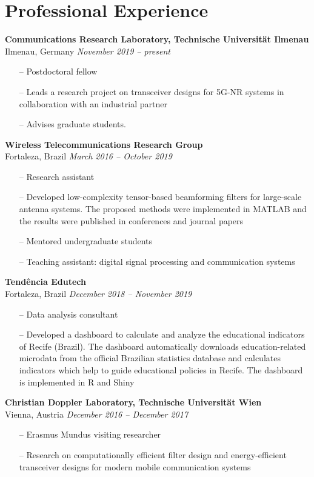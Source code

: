 \section{Professional Experience}

{\bf Communications Research Laboratory, Technische Universit\"at Ilmenau}\\
Ilmenau, Germany  \hfill {\it November 2019 -- present} \\
\begin{itemize}
	\item[--]	Postdoctoral fellow
	\item[--] Leads a research project on transceiver designs for 5G-NR systems in collaboration with an industrial partner
	\item[--] Advises graduate students.
\end{itemize}

{\bf Wireless Telecommunications Research Group}\\
Fortaleza, Brazil \hfill {\it March 2016 -- October 2019}\\
\begin{itemize}
	\item[--] Research assistant
	\item[--] Developed low-complexity tensor-based beamforming filters for large-scale antenna systems. The proposed methods were implemented in MATLAB and the results were published in conferences and journal papers
	\item[--] Mentored undergraduate students
	\item[--] Teaching assistant: digital signal processing and communication systems
\end{itemize}

{\bf Tendência Edutech}\\
Fortaleza, Brazil \hfill {\it December 2018 -- November 2019}\\
\begin{itemize}
	\item[--] Data analysis consultant
	\item[--] Developed a dashboard to calculate and analyze the educational indicators of Recife (Brazil). The dashboard automatically downloads education-related microdata from the official Brazilian statistics database and calculates indicators which help to guide educational policies in Recife. The dashboard is implemented in R and Shiny
\end{itemize}

{\bf Christian Doppler Laboratory, Technische Universit\"at Wien}\\
Vienna, Austria \hfill {\it December 2016 -- December 2017} \\
\begin{itemize}
	\item[--] Erasmus Mundus visiting researcher 
	\item[--] Research on computationally efficient filter design and energy-efficient transceiver designs for modern mobile communication systems
\end{itemize}

